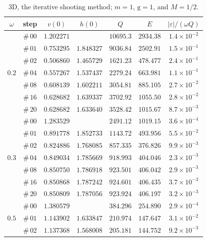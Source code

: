 \documentclass[12pt]{extarticle}
\newcommand{\coupling}{\mathrm{g}}
\theoremstyle{plain}
\theoremstyle{remark}
\begin{document}
\begin{table}[!ht]
\begin{center}
\caption{\footnotesize
3D, the iterative shooting method; $m=1$, $\coupling=1$, and $M=1/2$.
}
\begin{tabular}{ccccccc} \toprule
$\omega$ & step & $v(0)$ & $h(0)$ & $Q$ & $E$ & $|\varepsilon|/(\omega Q)$\\
\midrule
\multirow{7}{*}{$0.2$} & $\#\,00$ & $1.202271$ &  & $10695.3$ & $2934.38$ & $1.4\times10^{-2}$ \\
 & $\#\,01$ & $0.753295$ & $1.848327$ & $9036.84$ & $2502.91$ & $1.5\times10^{-1}$ \\
 & $\#\,02$ & $0.506860$ & $1.465729$ & $1621.23$ & $478.477$ & $2.4\times10^{-1}$ \\
 & $\#\,04$ & $0.557267$ & $1.537437$ & $2279.24$ & $663.981$ & $1.1\times10^{-1}$ \\
 & $\#\,08$ & $0.608139$ & $1.602211$ & $3054.81$ & $885.105$ & $2.7\times10^{-2}$ \\
 & $\#\,16$ & $0.628682$ & $1.639337$ & $3702.92$ & $1055.50$ & $2.8\times10^{-2}$ \\
 & $\#\,20$ & $0.628682$ & $1.633640$ & $3528.42$ & $1015.67$ & $8.7\times10^{-3}$ \\
\midrule
\multirow{7}{*}{$0.3$} & $\#\,00$ & $1.283529$ &  & $2491.12$ & $1019.15$ & $3.6\times10^{-4}$ \\
 & $\#\,01$ & $0.891778$ & $1.852733$ & $1143.72$ & $493.956$ & $5.5\times10^{-2}$ \\
 & $\#\,02$ & $0.824886$ & $1.768085$ & $857.335$ & $376.826$ & $9.9\times10^{-3}$ \\
 & $\#\,04$ & $0.849034$ & $1.785669$ & $918.993$ & $404.046$ & $2.3\times10^{-3}$ \\
 & $\#\,08$ & $0.850750$ & $1.786918$ & $923.501$ & $406.042$ & $2.9\times10^{-3}$ \\
 & $\#\,16$ & $0.850868$ & $1.787242$ & $924.601$ & $406.435$ & $3.7\times10^{-3}$ \\
 & $\#\,20$ & $0.850809$ & $1.787056$ & $923.924$ & $406.197$ & $3.2\times10^{-3}$ \\
\midrule
\multirow{7}{*}{$0.5$} & $\#\,00$ & $1.380579$ &  & $384.296$ & $254.890$ & $2.9\times10^{-4}$ \\
 & $\#\,01$ & $1.143902$ & $1.633847$ & $210.974$ & $147.647$ & $3.1\times10^{-2}$ \\
 & $\#\,02$ & $1.137368$ & $1.568008$ & $205.181$ & $144.752$ & $9.2\times10^{-3}$ \\

\end{tabular}
\end{center}
\end{table}
\end{document}
